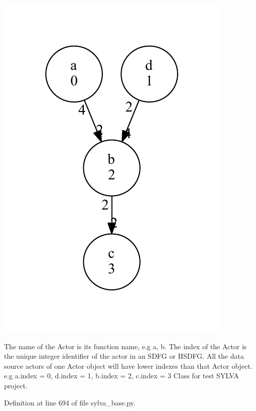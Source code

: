 \begin{DoxyImage}
\includegraphics[width=\textwidth,height=\textheight/2,keepaspectratio=true]{dot_SDFG_example}
\end{DoxyImage}
 The name of the Actor is its function name, e.\+g {\ttfamily a}, {\ttfamily b}. The index of the Actor is the unique integer identifier of the actor in an S\+D\+FG or H\+S\+D\+FG. All the data source actors of one Actor object will have lower indexes than that Actor object. e.\+g {\ttfamily a.\+index = 0}, {\ttfamily d.\+index = 1}, {\ttfamily b.\+index = 2}, {\ttfamily c.\+index = 3} Class for test S\+Y\+L\+VA project. 

Definition at line 694 of file sylva\+\_\+base.\+py.




